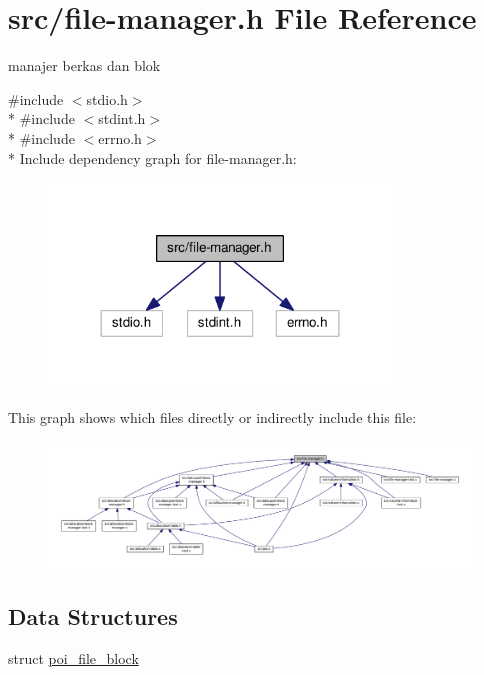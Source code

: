 \hypertarget{file-manager_8h}{\section{src/file-\/manager.h File Reference}
\label{file-manager_8h}
}


manajer berkas dan blok  


{\ttfamily \#include $<$stdio.\-h$>$}\\*
{\ttfamily \#include $<$stdint.\-h$>$}\\*
{\ttfamily \#include $<$errno.\-h$>$}\\*
Include dependency graph for file-\/manager.h\-:\nopagebreak
\begin{figure}[H]
\begin{center}
\leavevmode
\includegraphics[width=258pt]{file-manager_8h__incl}
\end{center}
\end{figure}
This graph shows which files directly or indirectly include this file\-:
\nopagebreak
\begin{figure}[H]
\begin{center}
\leavevmode
\includegraphics[width=350pt]{file-manager_8h__dep__incl}
\end{center}
\end{figure}
\subsection*{Data Structures}
\begin{DoxyCompactItemize}
\item 
struct \hyperlink{structpoi__file__block}{poi\-\_\-file\-\_\-block}
\end{DoxyCompactItemize}
